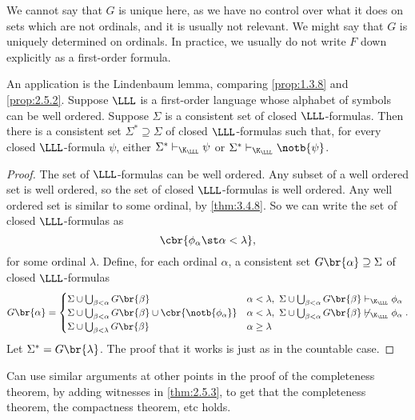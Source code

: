 We cannot say that $ G $ is unique here, as we have no control over what it does on sets which are not ordinals, and it is usually not relevant. We might say that $ G $ is uniquely determined on ordinals. In practice, we usually do not write $ F $ down explicitly as a first-order formula.

\begin{remark}
An application is the Lindenbaum lemma, comparing \ref{prop:1.3.8} and \ref{prop:2.5.2}. Suppose $ \LLL $ is a first-order language whose alphabet of symbols can be well ordered. Suppose $ \Sigma $ is a consistent set of closed $ \LLL $-formulas. Then there is a consistent set $ \Sigma^* \supseteq \Sigma $ of closed $ \LLL $-formulas such that, for every closed $ \LLL $-formula $ \psi $, either $ \Sigma^* \vdash_{\K_\LLL} \psi $ or $ \Sigma^* \vdash_{\K_\LLL} \notb{\psi} $.
\end{remark}

\begin{proof}
The set of $ \LLL $-formulas can be well ordered. Any subset of a well ordered set is well ordered, so the set of closed $ \LLL $-formulas is well ordered. Any well ordered set is similar to some ordinal, by \ref{thm:3.4.8}. So we can write the set of closed $ \LLL $-formulas as
$$ \cbr{\phi_\alpha \st \alpha < \lambda}, $$
for some ordinal $ \lambda $. Define, for each ordinal $ \alpha $, a consistent set $ G\br{\alpha} \supseteq \Sigma $ of closed $ \LLL $-formulas
$$ G\br{\alpha} =
\begin{cases}
\Sigma \cup \bigcup_{\beta < \alpha} G\br{\beta} & \alpha < \lambda, \ \Sigma \cup \bigcup_{\beta < \alpha} G\br{\beta} \vdash_{\K_\LLL} \phi_\alpha \\
\Sigma \cup \bigcup_{\beta < \alpha} G\br{\beta} \cup \cbr{\notb{\phi_\alpha}} & \alpha < \lambda, \ \Sigma \cup \bigcup_{\beta < \alpha} G\br{\beta} \not\vdash_{\K_\LLL} \phi_\alpha \\
\Sigma \cup \bigcup_{\beta < \lambda} G\br{\beta} & \alpha \ge \lambda
\end{cases}.
$$
Let $ \Sigma^* = G\br{\lambda} $. The proof that it works is just as in the countable case.
\end{proof}


\begin{remark}
Can use similar arguments at other points in the proof of the completeness theorem, by adding witnesses in \ref{thm:2.5.3}, to get that the completeness theorem, the compactness theorem, etc holds.
\end{remark}

